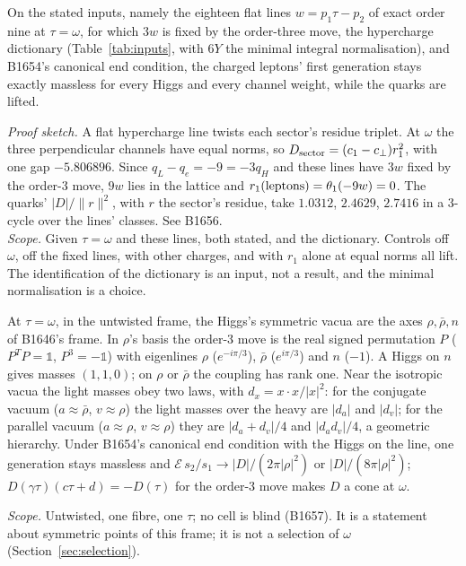 \begin{proposition}[The lepton sector's null vector at $\tau=\omega$; B1656]\label{prop:electron}
On the stated inputs, namely the eighteen flat lines $w=p_1\tau-p_2$ of exact order nine at $\tau=\omega$, for which $3w$ is fixed by the order-three move, the hypercharge
dictionary (Table~\ref{tab:inputs}, with $6Y$ the
minimal integral normalisation), and B1654's canonical end condition, the charged leptons' first generation stays exactly
massless for every Higgs and every channel weight, while the quarks are lifted.
\end{proposition}
\noindent\emph{Proof sketch.} A flat hypercharge line twists each sector's residue triplet. At $\omega$ the three
perpendicular channels have equal norms, so $D_{\rm sector}=(c_1-c_\perp)r_1^2$, with one gap $-5.806896$. Since $q_L-q_e=-9=-3q_H$
and these lines have $3w$ fixed by the order-3 move, $9w$ lies in the lattice and $r_1({\rm leptons})=\theta_1(-9w)=0$. The
quarks' $|D|/\|r\|^2$, with $r$ the sector's residue, take $1.0312$, $2.4629$, $2.7416$ in a 3-cycle over the lines' classes. See B1656.\\
\emph{Scope.} Given $\tau=\omega$ and these lines, both stated, and the dictionary. Controls off $\omega$, off the fixed lines,
with other charges, and with $r_1$ alone at equal norms all lift. The identification of the dictionary is an input, not a
result, and the minimal normalisation is a choice.

\begin{proposition}\label{prop:symmetric}
At $\tau=\omega$, in the untwisted frame, the Higgs's symmetric vacua are the axes $\rho,\bar\rho,n$ of B1646's frame.
In $\rho$'s basis the order-3 move is the real signed permutation $P$ ($P^TP=\mathbb 1$, $P^3=-\mathbb 1$) with eigenlines
$\rho$ ($e^{-i\pi/3}$), $\bar\rho$ ($e^{i\pi/3}$) and $n$ ($-1$). A Higgs on $n$ gives masses $(1,1,0)$; on $\rho$ or $\bar\rho$ the
coupling has rank one. Near the isotropic vacua the light masses obey two laws, with $d_x=x\cdot x/|x|^2$: for the conjugate
vacuum ($a\approx\bar\rho$, $v\approx\rho$) the light masses over the heavy are $|d_a|$ and $|d_v|$; for the parallel vacuum
($a\approx\rho$, $v\approx\rho$) they are $|d_a+d_v|/4$ and $|d_ad_v|/4$, a geometric hierarchy. Under B1654's canonical end
condition with the Higgs on the line, one generation stays massless and $\mathcal E\,s_2/s_1\to|D|/(2\pi|\rho|^2)$ or
$|D|/(8\pi|\rho|^2)$; $D(\gamma\tau)(c\tau+d)=-D(\tau)$ for the order-3 move makes $D$ a cone at $\omega$.
\end{proposition}
\noindent\emph{Scope.} Untwisted, one fibre, one $\tau$; no cell is blind (B1657). It is a statement about symmetric points
of this frame; it is not a selection of $\omega$ (Section~\ref{sec:selection}).

